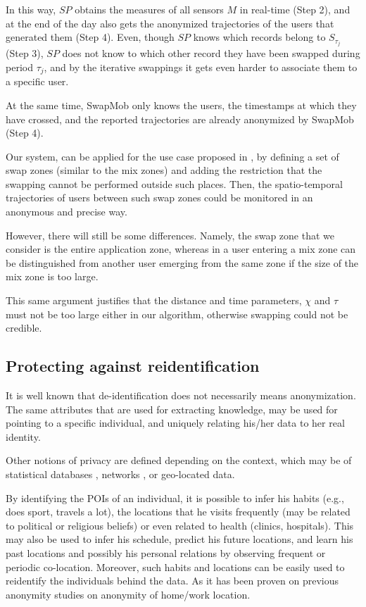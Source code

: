 \documentclass{llncs}
\begin{document}
In this way, $SP$ obtains the measures of all sensors $M$ in real-time (Step 2), and at the end of the day also gets the anonymized trajectories of the users that generated them (Step 4). 
Even, though $SP$ knows which records belong to $S_{\tau_j}$ (Step 3), $SP$ does not know to which other record they have been swapped during period $\tau_j$, and by the iterative swappings it gets even harder to associate them to a specific user.

At the same time, SwapMob only knows the users, the timestamps at which they have crossed, and the reported trajectories are already anonymized by SwapMob (Step 4). 

Our system, can be applied for the use case proposed in \cite{Beresford2003}, by defining a set of swap zones (similar to the mix zones) and adding the restriction that the swapping cannot be performed outside such places. Then, the spatio-temporal trajectories of users between such swap zones could be monitored in an anonymous and precise way.

 
However, there will still be some differences. Namely, the swap zone that we consider is the entire application zone, whereas in \cite{Beresford2003} a user entering a mix zone can be distinguished from another user emerging from the same zone if the size of the mix zone is too large.

This same argument justifies that the distance and time parameters, $\chi$ and $\tau$ must not be too large either in our algorithm, otherwise swapping could not be credible. 

 

\subsection{Protecting against reidentification} %
It is well known that de-identification does not necessarily means anonymization. The same attributes that are used for extracting knowledge, may be used for pointing to a specific individual, and uniquely relating his/her data to her real identity.

Other notions of privacy are defined depending on the context, which may be of statistical databases \cite{Danezis15}, networks \cite{Zhou:2008}, or geo-located data. 

By identifying the POIs of an individual, it is possible to infer his habits (e.g., does sport, travels a lot), the locations that he visits frequently (may be related to political or religious beliefs) or even related to health (clinics, hospitals). This may also be used to infer his schedule, predict his future locations,  and learn his past locations and possibly his personal relations by observing frequent or periodic co-location.
Moreover, such habits and locations can be easily used to reidentify the individuals behind the data. As it has been proven on previous anonymity studies on anonymity of home/work location.
\end{document}
